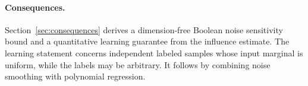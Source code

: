 \paragraph{Consequences.}
Section~\ref{sec:consequences} derives a dimension-free Boolean noise
sensitivity bound and a quantitative learning guarantee from the influence
estimate. The learning statement concerns independent labeled samples
whose input marginal is uniform, while the labels may be arbitrary.
It follows by combining noise smoothing with polynomial regression.
